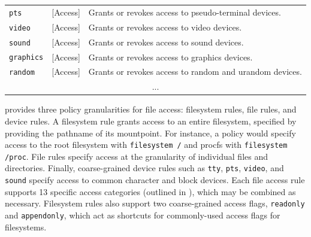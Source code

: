 {\begin{longtable}[c]{llp{25em}}
  \texttt{pts}        & [Access]            &
    Grants or revokes access to pseudo-terminal devices. \\
  \texttt{video}      & [Access]            &
    Grants or revokes access to video devices. \\
  \texttt{sound}      & [Access]            &
    Grants or revokes access to sound devices. \\
  \texttt{graphics}   & [Access]            &
    Grants or revokes access to graphics devices. \\
  \texttt{random}   & [Access]            &
    Grants or revokes access to random and urandom devices. \\
  \multicolumn{3}{c}{...} \\
  \bottomrule
\end{longtable}
}

\bpfcontain{} provides three policy granularities for file access: filesystem rules, file rules, and device rules. A filesystem rule grants access to an entire filesystem, specified by providing the pathname of its mountpoint. For instance, a policy would specify access to the root filesystem with \texttt{filesystem /} and procfs with \texttt{filesystem /proc}. File rules specify access at the granularity of individual files and directories. Finally, coarse-grained device rules such as \texttt{tty}, \texttt{pts}, \texttt{video}, and \texttt{sound} specify access to common character and block devices. Each file access rule supports 13 specific access categories (outlined in ), which may be combined as necessary. Filesystem rules also support two coarse-grained access flags, \texttt{readonly} and \texttt{appendonly}, which act as shortcuts for commonly-used access flags for filesystems.

